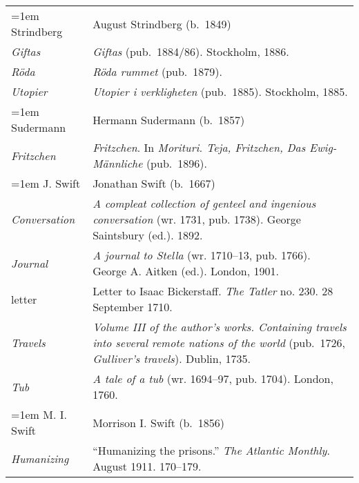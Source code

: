 \begin{xltabular}{\textwidth}{ lQ }
\hangindent=1em  Strindberg & August Strindberg (b.~1849) \\
\hspace{1em}\textit{Giftas} & \textit{Giftas} (pub.~1884/86). Stockholm, 1886. \\
\hspace{1em}\textit{Röda} & \textit{Röda rummet} (pub.~1879). \\
\hspace{1em}\textit{Utopier} & \textit{Utopier i verkligheten} (pub.~1885). Stockholm, 1885. \\

\hangindent=1em  Sudermann & Hermann Sudermann (b.~1857)\\
\hspace{1em}\textit{Fritzchen} & \textit{Fritzchen}. In \textit{Morituri. Teja, Fritzchen, Das Ewig-Männliche} (pub.~1896).\\

\hangindent=1em  J. Swift & Jonathan Swift (b.~1667) \\
\hspace{1em}\textit{Conversa\-tion} & \textit{A compleat collection of genteel and ingenious conversation} (wr. 1731, pub. 1738). George Saintsbury (ed.). 1892. \\
\hspace{1em}\textit{Journal} & \textit{A journal to Stella} (wr. 1710--13, pub. 1766). George A. Aitken (ed.). London, 1901. \\
\hspace{1em}letter & Letter to Isaac Bickerstaff. \textit{The Tatler} no. 230. 28 September 1710. \\ %
\hspace{1em}\textit{Travels} & \textit{Volume III of the author’s works. Containing travels into several remote nations of the world} (pub.~1726, \textit{Gulliver's travels}). Dublin, 1735. \\
\hspace{1em}\textit{Tub} & \textit{A tale of a tub} (wr. 1694--97, pub. 1704). London, 1760. \\

\hangindent=1em  M. I. Swift & Morrison I. Swift (b.~1856) \\ %
\hspace{1em}\textit{Humanizing} &  ``Humanizing the prisons.'' \textit{The Atlantic Monthly}. August 1911. 170--179.\\


\end{xltabular}
